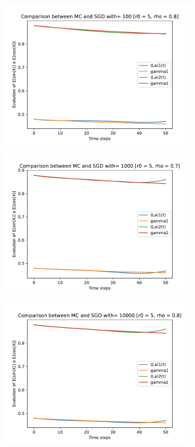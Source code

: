 \documentclass[a4paper,11pt,openright]{report}
\begin{document}
\begin{figure}[H]
\centering
\includegraphics[width=0.9\textwidth]{images/graphs T = 0.5/n = 4, M = 100 sine and cosine.pdf}
\end{figure}
\begin{figure}[H]
\centering
\includegraphics[width=0.9\textwidth]{images/graphs T = 0.5/n = 4, M = 1000 sine and cosine.pdf}
\end{figure}
\begin{figure}[H]
\centering
\includegraphics[width=0.9\textwidth]{images/graphs T = 0.5/n = 4, M = 10000 sine and cosine.pdf}
\end{figure}
\newpage
\end{document}
